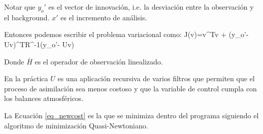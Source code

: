 Notar que $y_o'$ es el vector de innovación, i.e. la desviación entre la observación y el background. $x'$ es el incremento de análisis.

Entonces podemos escribir el problema variacional como:
\be\label{eq_newcost}
J(v)=v^Tv + (y_o'-Uv)^TR^{-1}(y_o'- Uv)
\ee 

Donde $\overline{H}$ es el operador de observación linealizado.

En la práctica $U$ es una aplicación recursiva de varios filtros que permiten que el proceso de asimilación sea menos costoso y que la variable de control cumpla con los balances atmosféricos.

La Ecuación \ref{eq_newcost} es la que se minimiza dentro del programa siguiendo el algoritmo de minimización Quasi-Newtoniano.
